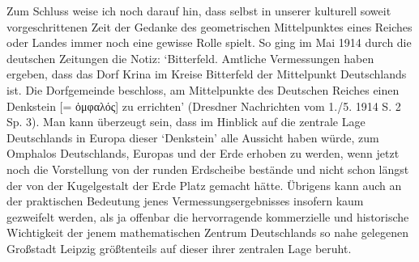 \documentclass[a4paper, 11pt, oneside]{article}
\begin{document}
Zum Schluss weise ich noch darauf hin, dass selbst in unserer kulturell soweit vorgeschrittenen Zeit der Gedanke des geometrischen Mittelpunktes eines Reiches oder Landes immer noch eine gewisse Rolle spielt. So ging im Mai 1914 durch die deutschen Zeitungen die Notiz: `Bitterfeld. Amtliche Vermessungen haben ergeben, dass das Dorf Krina im Kreise Bitterfeld der Mittelpunkt Deutschlands ist. Die Dorfgemeinde beschloss, am Mittelpunkte des Deutschen Reiches einen Denkstein [= ὀμφαλός] zu errichten' (Dresdner Nachrichten vom 1./5. 1914 S. 2 Sp. 3). Man kann überzeugt sein, dass im Hinblick auf die zentrale Lage Deutschlands in Europa dieser `Denkstein' alle Aussicht haben würde, zum Omphalos Deutschlands, Europas und der Erde erhoben zu werden, wenn jetzt noch die Vorstellung von der runden Erdscheibe bestände und nicht schon längst der von der Kugelgestalt der Erde Platz gemacht hätte. Übrigens kann auch an der praktischen Bedeutung jenes Vermessungsergebnisses insofern kaum gezweifelt werden, als ja offenbar die hervorragende kommerzielle und historische Wichtigkeit der jenem mathematischen Zentrum Deutschlands so nahe gelegenen Großstadt Leipzig größtenteils auf dieser ihrer zentralen Lage beruht.
\end{document}
